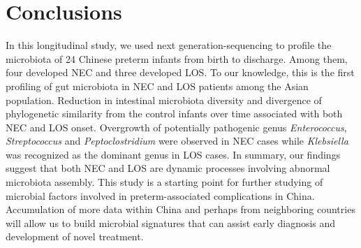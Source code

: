 \documentclass[fleqn,10pt]{wlpeerj} %
\begin{document}
\section*{Conclusions}
In this longitudinal study, we used next generation-sequencing to profile the microbiota of 24 Chinese preterm infants from birth to discharge.  Among them, four developed NEC and three developed LOS. To our knowledge, this is the first profiling of gut microbiota in NEC and LOS patients among the Asian population. Reduction in intestinal microbiota diversity and divergence of phylogenetic similarity from the control infants over time associated with both NEC and LOS onset. Overgrowth of potentially pathogenic genus \textit{Enterococcus}, \textit{Streptococcus} and \textit{Peptoclostridium}  were observed in NEC cases while \textit{Klebsiella} was recognized as the dominant genus in LOS cases. In summary, our findings suggest that both NEC and LOS are dynamic processes involving abnormal microbiota assembly. This study is a starting point for further studying of microbial factors involved in preterm-associated complications in China. Accumulation of more data within China and perhaps from neighboring countries will allow us to build microbial signatures that can assist early diagnosis and development of novel treatment.



\end{document}
